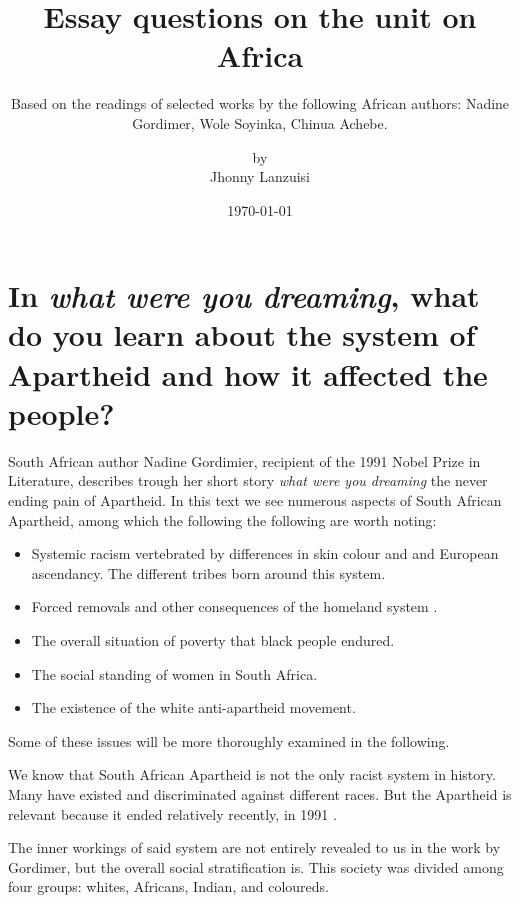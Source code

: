%
\title{Essay questions on the unit on Africa}
\subtitle{Based on the readings of selected works
          by the following African authors: Nadine Gordimer,
          Wole Soyinka, Chinua Achebe.
}
\titlehead{Universidad Simón Bolívar\hfill Caracas, Venezuela}
\subject{Literatura en ingles}
\author{by \\ Jhonny Lanzuisi}
\date{\today}
\maketitle

\section[Second Question]{In {\normalfont\em what were you dreaming}, what do you learn about the system of Apartheid and how it affected the people?}

South African author Nadine Gordimier,
recipient of the 1991 Nobel Prize in Literature\cite{noauthor_nadine_2021},
describes trough her short story \textit{what were you dreaming}
the never ending pain of Apartheid.
In this text  we see numerous aspects
of South African Apartheid,
among which the following the following
are worth noting:
\begin{itemize}
\item Systemic racism vertebrated by differences in skin colour and
      and European ascendancy. The different tribes born around this system.
\item Forced removals and other consequences of the homeland system \cite{noauthor_apartheid_2021}.
\item The overall situation of poverty that black people endured.
\item The social standing of women in South Africa.
\item The existence of the white anti-apartheid movement.
\end{itemize}

Some of these issues will be more thoroughly examined in the following.

We know that South African Apartheid is not the only
racist system in history. Many have existed and discriminated
against different races.
But the Apartheid is relevant because it ended relatively
recently, in 1991 \cite{noauthor_apartheid_2021}.

The inner workings of said system are not entirely revealed to us
in the work by Gordimer, but the overall social stratification is.
This society was divided among four groups: whites, Africans, Indian,
and coloureds.

